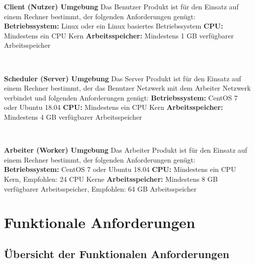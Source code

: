 \documentclass[a4paper,12pt]{article}
\begin{document}
\begin{itemize}
\begin{minipage}[t]{\linewidth}
\item \textbf{Client (Nutzer) Umgebung}\newline
Das Benutzer Produkt ist für den Einsatz auf einem Rechner bestimmt, der folgenden Anforderungen genügt:
\subitem \textbf{Betriebssystem:} Linux oder ein Linux basiertes Betriebssystem
\subitem \textbf{CPU:} Mindestens ein CPU Kern
\subitem \textbf{Arbeitsspeicher:} Mindestens 1 GB verfügbarer Arbeitsspeicher
\end{minipage}
\\

\begin{minipage}[t]{\linewidth}
\item \textbf{Scheduler (Server) Umgebung}\newline
Das Server Produkt ist für den Einsatz auf einem Rechner bestimmt, der das Benutzer Netzwerk mit dem Arbeiter Netzwerk verbindet und folgenden Anforderungen genügt:
\subitem \textbf{Betriebssystem:} CentOS 7 oder Ubuntu 18.04
\subitem \textbf{CPU:} Mindestens ein CPU Kern
\subitem \textbf{Arbeitsspeicher:} Mindestens 4 GB verfügbarer Arbeitsspeicher
\end{minipage}
\\

\begin{minipage}[t]{\linewidth}
\item \textbf{Arbeiter (Worker) Umgebung}\newline
Das Arbeiter Produkt ist für den Einsatz auf einem Rechner bestimmt, der folgenden Anforderungen genügt:
\subitem \textbf{Betriebssystem:} CentOS 7 oder Ubuntu 18.04
\subitem \textbf{CPU:} Mindestens ein CPU Kern, Empfohlen: 24 CPU Kerne
\subitem \textbf{Arbeitsspeicher:} Mindestens 8 GB verfügbarer Arbeitsspeicher, Empfohlen: 64 GB Arbeitsspeicher
\end{minipage}
\end{itemize}
\newpage

\section{Funktionale Anforderungen}

\subsection{Übersicht der  Funktionalen Anforderungen}
\end{document}
